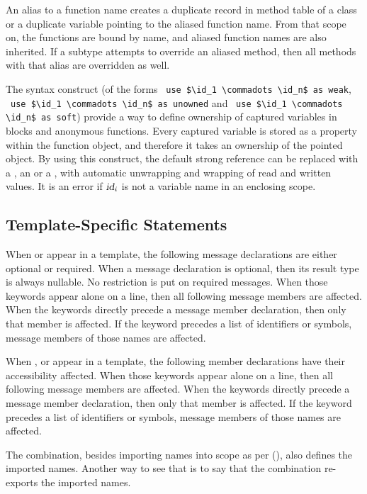 An alias to a function name creates a duplicate record in method table of a class or a duplicate variable pointing to the aliased function name. From that scope on, the functions are bound by name, and aliased function names are also inherited. If a subtype attempts to override an aliased method, then all methods with that alias are overridden as well. 

The  syntax construct (of the forms ~\lstinline{use $\id_1 \commadots \id_n$ as weak}, ~\lstinline{use $\id_1 \commadots \id_n$ as unowned} and ~\lstinline{use $\id_1 \commadots \id_n$ as soft}) provide a way to define ownership of captured variables in blocks and anonymous functions. Every captured variable is stored as a property within the function object, and therefore it takes an ownership of the pointed object. By using this construct, the default strong reference can be replaced with a , an  or a , with automatic unwrapping and wrapping of read and written values. It is an error if $\mbox{\sl id}_i$ is not a variable name in an enclosing scope. 






\subsection{Template-Specific Statements}

When  or  appear in a template, the following message declarations are either optional or required. When a message declaration is optional, then its result type is always nullable. No restriction is put on required messages. When those keywords appear alone on a line, then all following message members are affected. When the keywords directly precede a message member declaration, then only that member is affected. If the keyword precedes a list of identifiers or symbols, message members of those names are affected. 

When ,  or  appear in a template, the following member declarations have their accessibility affected. When those keywords appear alone on a line, then all following message members are affected. When the keywords directly precede a message member declaration, then only that member is affected. If the keyword precedes a list of identifiers or symbols, message members of those names are affected. 

The  combination, besides importing names into scope as per (), also defines the imported names. Another way to see that is to say that the combination re-exports the imported names. 

